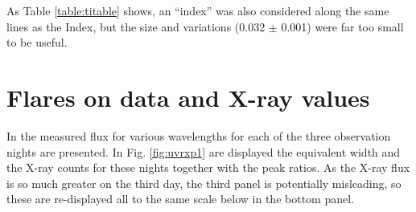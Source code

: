 \begin{table}[!htbp]
\centering
{}
\caption{Results for calculation of median and standard deviation of the equivalent widths of the TiO transition at 6572.468{\AA} to
6573.288{\AA} from \harps. The observations are separated where they are 300 or more days apart.}
\protect\label{table:titable}
\end{table}

As Table \ref{table:titable} shows, an ``index'' was also considered along the same lines as the {\ha} Index, but the
size and variations (0.032 $\pm$ 0.001) were far too small to be useful.

\section{Flares on {\uves} data and X-ray values}
\protect\label{section:uvesflares}

In \citet[fig. 1 to fig. 3]{fuhrmeister11} the measured flux for various wavelengths for each of the three observation
nights are presented. In Fig. \ref{fig:uvrxp1} are displayed the {\ha} equivalent width and the X-ray counts for these
nights together with the peak ratios. As the X-ray flux is so much greater on the third day, the third panel is
potentially misleading, so these are re-displayed all to the same scale below in the bottom panel.

